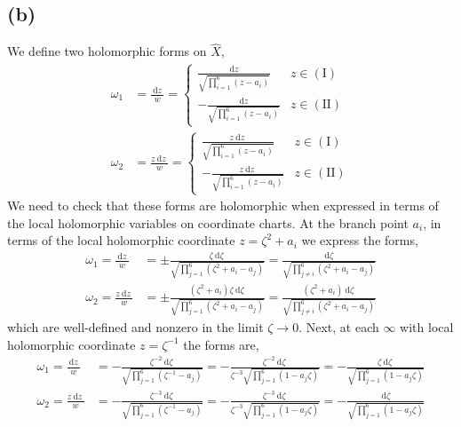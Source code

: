 \documentclass[12pt]{extarticle}
\renewcommand{\d}[1]{\: \mathrm{d}#1 \:}
\theoremstyle{definition}
\begin{document}
\subsection*{(b)}

We define two holomorphic forms on $\hat{X}$,
\begin{align*}
\omega_1 & = \frac{\d{z}}{w} = 
\begin{cases}
\frac{\d{z}}{\sqrt{\prod_{i = 1}^6 (z - a_i)}} &  z \in \mathrm{(I)}
\\
- \frac{\d{z}}{\sqrt{\prod_{i = 1}^6 (z - a_i)}} & z \in \mathrm{(II)}
\end{cases}
\\
\omega_2 & = \frac{z \d{z}}{w} = 
\begin{cases}
\frac{z \d{z}}{\sqrt{\prod_{i = 1}^6 (z - a_i)}} & z \in \mathrm{(I)}
\\
- \frac{z \d{z}}{\sqrt{\prod_{i = 1}^6 (z - a_i)}} & z \in \mathrm{(II)}
\end{cases}
\end{align*}
We need to check that these forms are holomorphic when expressed in terms of the local holomorphic variables on coordinate charts. At the branch point $a_i$, in terms of the local holomorphic coordinate $z = \zeta^2 + a_i$ we express the forms,
\begin{align*}
\omega_1 = \frac{\d{z}}{w} & = \pm \frac{\zeta \d{\zeta}}{\sqrt{\prod_{j = 1}^6 (\zeta^2 + a_i - a_j) }} = \frac{\d{\zeta}}{\sqrt{\prod_{j \neq i}^6 (\zeta^2 + a_i - a_j) }}
\\
\omega_2 = \frac{z \d{z}}{w} & = \pm \frac{(\zeta^2 + a_i) \zeta \d{\zeta}}{\sqrt{\prod_{j = 1}^6 (\zeta^2 + a_i - a_j) }} = \frac{(\zeta^2 + a_i) \d{\zeta}}{\sqrt{\prod_{j \neq i}^6 (\zeta^2 + a_i - a_j) }}
\end{align*}
which are well-defined and nonzero in the limit $\zeta \to 0$. Next, at each $\infty$ with local holomorphic coordinate $z = \zeta^{-1}$ the forms are,
\begin{align*}
\omega_1 = \frac{\d{z}}{w} & = - \frac{\zeta^{-2} \d{\zeta}}{\sqrt{\prod_{j = 1}^6 (\zeta^{-1} - a_j) }} = - \frac{\zeta^{-2} \d{\zeta}}{\zeta^{-3} \sqrt{\prod_{j = 1}^6 (1 - a_j \zeta) }} = - \frac{\zeta \d{\zeta}}{\sqrt{\prod_{j = 1}^6 (1 - a_j \zeta)}} 
\\
\omega_2 = \frac{z\d{z}}{w} & = - \frac{\zeta^{-3} \d{\zeta}}{\sqrt{\prod_{j = 1}^6 (\zeta^{-1} - a_j) }} = - \frac{\zeta^{-3} \d{\zeta}}{\zeta^{-3} \sqrt{\prod_{j = 1}^6 (1 - a_j \zeta) }} = - \frac{\d{\zeta}}{\sqrt{\prod_{j = 1}^6 (1 - a_j \zeta)}} 
\end{align*}
\end{document}
